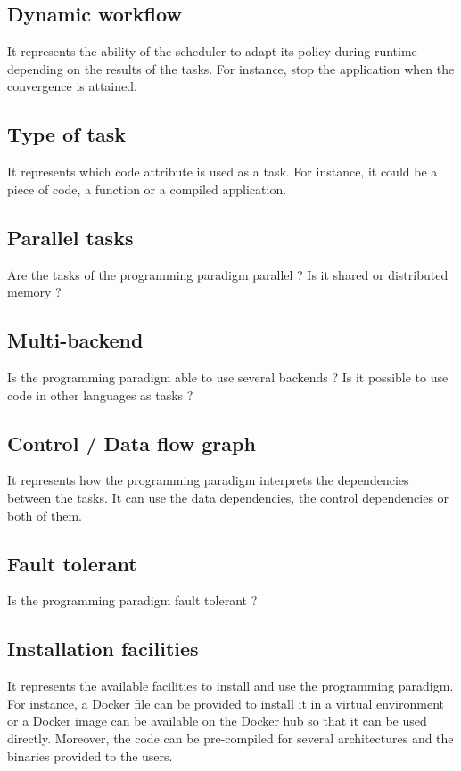 \subsection{Dynamic workflow}
It represents the ability of the scheduler to adapt its policy during runtime depending on the results of the tasks.
For instance, stop the application when the convergence is attained.

\subsection{Type of task}
It represents which code attribute is used as a task.
For instance, it could be a piece of code, a function or a compiled application.

\subsection{Parallel tasks}
Are the tasks of the programming paradigm parallel ?
Is it shared or distributed memory ?

\subsection{Multi-backend}
Is the programming paradigm able to use several backends ?
Is it possible to use code in other languages as tasks ?

\subsection{Control / Data flow graph}
It represents how the programming paradigm interprets the dependencies between the tasks.
It can use the data dependencies, the control dependencies or both of them.

\subsection{Fault tolerant}
Is the programming paradigm fault tolerant ?

\subsection{Installation facilities}
It represents the available facilities to install and use the programming paradigm.
For instance, a Docker file can be provided to install it in a virtual environment or a Docker image can be available on the Docker hub so that it can be used directly.
Moreover, the code can be pre-compiled for several architectures and the binaries provided to the users.

